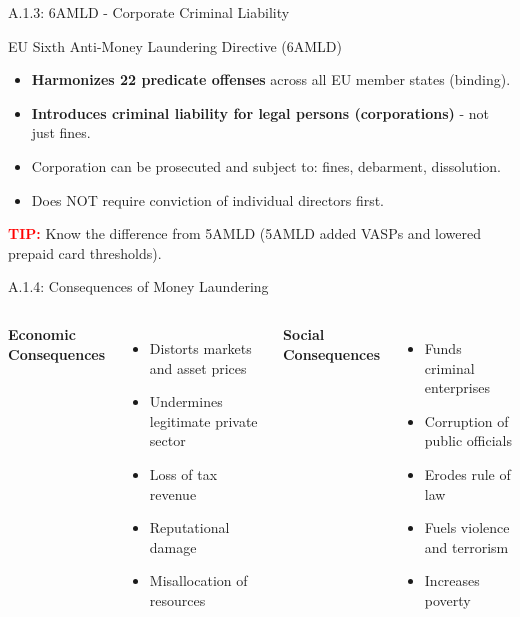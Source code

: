 \documentclass{beamer}
\begin{document}
	\begin{frame}{A.1.3: 6AMLD - Corporate Criminal Liability}
		\begin{block}{EU Sixth Anti-Money Laundering Directive (6AMLD)}
			\begin{itemize}
				\item \textbf{Harmonizes 22 predicate offenses} across all EU member states (binding).
				\item \textbf{Introduces criminal liability for legal persons (corporations)} - not just fines.
				\item Corporation can be prosecuted and subject to: fines, debarment, dissolution.
				\item Does NOT require conviction of individual directors first.
			\end{itemize}
		\end{block}
		\textcolor{red}{\textbf{TIP:}} Know the difference from 5AMLD (5AMLD added VASPs and lowered prepaid card thresholds).
	\end{frame}
	
	\begin{frame}{A.1.4: Consequences of Money Laundering}
		\begin{columns}
			\textbf{Economic Consequences}
			\begin{itemize}
				\item Distorts markets and asset prices
				\item Undermines legitimate private sector
				\item Loss of tax revenue
				\item Reputational damage
				\item Misallocation of resources
			\end{itemize}
			\textbf{Social Consequences}
			\begin{itemize}
				\item Funds criminal enterprises
				\item Corruption of public officials
				\item Erodes rule of law
				\item Fuels violence and terrorism
				\item Increases poverty
			\end{itemize}
		\end{columns}
	\end{frame}
	
\end{document}
